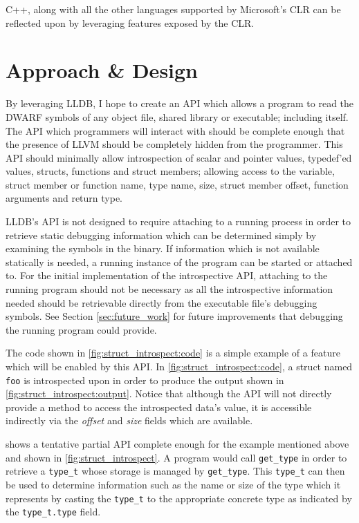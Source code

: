 \documentclass[draft]{article}
\begin{document}
C++, along with all the other languages supported by Microsoft's CLR can be
reflected upon by leveraging features exposed by the CLR. \autocite{clr-cpp}

\section{Approach \& Design}
By leveraging LLDB, I hope to create an API which allows a program to read the
DWARF symbols of any object file, shared library or executable; including
itself. The API which programmers will interact with should be complete enough
that the presence of LLVM should be completely hidden from the programmer. This
API should minimally allow introspection of scalar and pointer values,
typedef'ed values, structs, functions and struct members; allowing access to the
variable, struct member or function name, type name, size, struct member offset,
function arguments and return type.

LLDB's API is not designed to require attaching to a running process in order to
retrieve static debugging information which can be determined simply by
examining the symbols in the binary. If information which is not available
statically is needed, a running instance of the program can be started or
attached to. For the initial implementation of the introspective API, attaching
to the running program should not be necessary as all the introspective
information needed should be retrievable directly from the executable file's
debugging symbols. See Section \ref{sec:future_work} for future improvements
that debugging the running program could provide.

The code shown in \cref{fig:struct_introspect:code} is a simple example of a
feature which will be enabled by this API. In \cref{fig:struct_introspect:code},
a struct named \texttt{foo} is introspected upon in order to produce the output
shown in \cref{fig:struct_introspect:output}. Notice that although the API will
not directly provide a method to access the introspected data's value, it is
accessible indirectly via the \emph{offset} and \emph{size} fields which are
available.

 shows a tentative partial API complete enough for
the example mentioned above and shown in \vref{fig:struct_introspect}. A program
would call \texttt{get\_type} in order to retrieve a \texttt{type\_t} whose
storage is managed by \texttt{get\_type}. This \texttt{type\_t} can then be used
to determine information such as the name or size of the type which it
represents by casting the \texttt{type\_t} to the appropriate concrete type as
indicated by the \texttt{type\_t.type} field.
\end{document}
